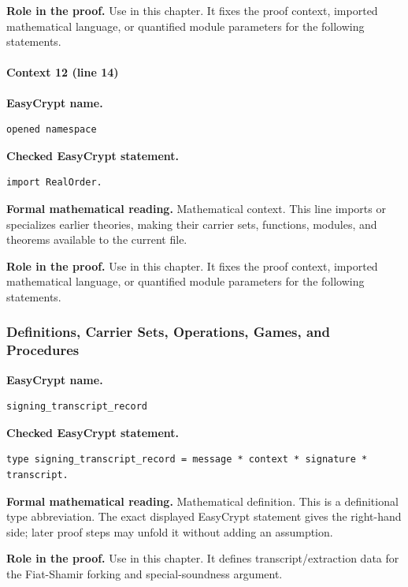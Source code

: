 \noindent\textbf{Role in the proof.}
Use in this chapter. It fixes the proof context, imported mathematical language, or quantified module parameters for the following statements.

\paragraph{Context 12 (line 14)}
\noindent\textbf{EasyCrypt name.}
\begin{lstlisting}[language=EasyCrypt,basicstyle=\ttfamily\scriptsize]
opened namespace
\end{lstlisting}
\noindent\textbf{Checked EasyCrypt statement.}
\begin{lstlisting}[language=EasyCrypt,basicstyle=\ttfamily\scriptsize]
import RealOrder.
\end{lstlisting}
\noindent\textbf{Formal mathematical reading.}
Mathematical context. This line imports or specializes earlier theories, making their carrier sets, functions, modules, and theorems available to the current file.

\noindent\textbf{Role in the proof.}
Use in this chapter. It fixes the proof context, imported mathematical language, or quantified module parameters for the following statements.

\subsubsection*{Definitions, Carrier Sets, Operations, Games, and Procedures}
\begin{formaldefinition}
\noindent\textbf{EasyCrypt name.}
\begin{lstlisting}[language=EasyCrypt,basicstyle=\ttfamily\scriptsize]
signing_transcript_record
\end{lstlisting}
\noindent\textbf{Checked EasyCrypt statement.}
\begin{lstlisting}[language=EasyCrypt,basicstyle=\ttfamily\scriptsize]
type signing_transcript_record = message * context * signature * transcript.
\end{lstlisting}
\noindent\textbf{Formal mathematical reading.}
Mathematical definition. This is a definitional type abbreviation.  The exact displayed EasyCrypt statement gives the right-hand side; later proof steps may unfold it without adding an assumption.

\noindent\textbf{Role in the proof.}
Use in this chapter. It defines transcript/extraction data for the Fiat-Shamir forking and special-soundness argument.

\end{formaldefinition}

